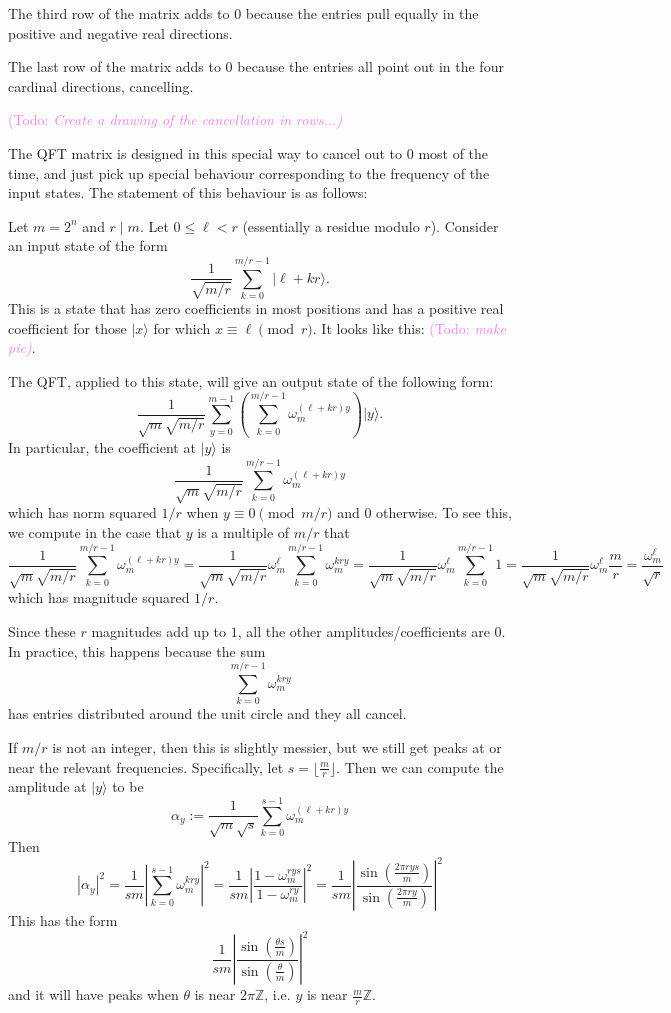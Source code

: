 \documentclass{article}
\theoremstyle{plain}
\theoremstyle{definition}
\theoremstyle{remark}
\numberwithin{theorem}{section}
\newcommand{\KS}[1]{\textcolor{violet}{{\sf (Todo:} {\sl{#1})}}}
\newcommand{\KS}[1]{}
\newcommand{\ZZ}{\mathbb{Z}}
\begin{document}
The third row of the matrix adds to $0$ because the entries  pull equally in the positive and negative real directions.

The last row of the matrix adds to $0$ because the entries all point out in the four cardinal directions, cancelling.

\KS{Create a drawing of the cancellation in rows...}

The QFT matrix is designed in this special way to cancel out to $0$ most of the time, and just pick up special behaviour corresponding to the frequency of the input states.  The statement of this behaviour is as follows:

Let $m = 2^n$ and $r \mid m$.  Let $0 \le \ell < r$ (essentially a residue modulo $r$).  Consider an input state of the form
\[
\frac{1}{\sqrt{m/r}} \sum_{k=0}^{m/r-1} | \ell + k r \rangle.
\]
This is a state that has zero coefficients in most positions and has a positive real coefficient for those $|x \rangle$ for which $x \equiv \ell \pmod{r}$.  It looks like this: \KS{make pic}.

The QFT, applied to this state, will give an output state of the following form:
\[
\frac{1}{\sqrt{m}\sqrt{m/r}} \sum_{y=0}^{m-1} \left(
\sum_{k=0}^{m/r-1} \omega_m^{(\ell+kr)y} \right) |y\rangle.
\]
In particular, the coefficient at $|y \rangle$ is
\[
\frac{1}{\sqrt{m}\sqrt{m/r}} \sum_{k=0}^{m/r-1} \omega_m^{(\ell+kr)y}
\]
which has norm squared $1/r$ when $y \equiv 0 \pmod{m/r}$ and $0$ otherwise.  To see this, we compute in the case that $y$ is a multiple of $m/r$ that
\[
\frac{1}{\sqrt{m}\sqrt{m/r}} \sum_{k=0}^{m/r-1} \omega_m^{(\ell+kr)y}
=
\frac{1}{\sqrt{m}\sqrt{m/r}} \omega_m^\ell \sum_{k=0}^{m/r-1} \omega_m^{kry}
=
\frac{1}{\sqrt{m}\sqrt{m/r}} \omega_m^\ell \sum_{k=0}^{m/r-1} 1
=
\frac{1}{\sqrt{m}\sqrt{m/r}} \omega_m^\ell \frac{m}{r}
=
 \frac{\omega_m^\ell}{\sqrt{r}}
\]
which has magnitude squared $1/r$.

Since these $r$ magnitudes add up to $1$, all the other amplitudes/coefficients are $0$.  In practice, this happens because the sum
\[
\sum_{k=0}^{m/r-1} \omega_m^{kry}
\]
has entries distributed around the unit circle and they all cancel.

If $m/r$ is not an integer, then this is slightly messier, but we still get peaks at or near the relevant frequencies.  Specifically, let $s = \lfloor \frac{m}{r} \rfloor$.  Then we can compute the amplitude at $|y \rangle$ to be
\[
\alpha_y := \frac{1}{\sqrt{m}\sqrt{s}} \sum_{k=0}^{s-1} \omega_m^{(\ell+kr)y}
\]
Then
\[
|\alpha_y|^2 = \frac{1}{sm} \left|
\sum_{k=0}^{s-1} \omega_m^{kry}
 \right|^2
 = \frac{1}{sm} \left|
\frac{1-\omega_m^{rys}}{1 - \omega_m^{ry}}
 \right|^2
  = \frac{1}{sm} \left|
\frac{\sin\left( \frac{2 \pi r y s}{m} \right)}{\sin\left( \frac{2 \pi r y}{m} \right)}
 \right|^2
\]
This has the form
\[
  \frac{1}{sm} \left|
\frac{\sin\left( \frac{\theta s}{m} \right)}{\sin\left( \frac{\theta}{m} \right)}
 \right|^2
 \]
and it will have peaks when $\theta$ is near $2\pi \ZZ$, i.e. $y$ is near $\frac{m}{r} \ZZ$.
\end{document}
